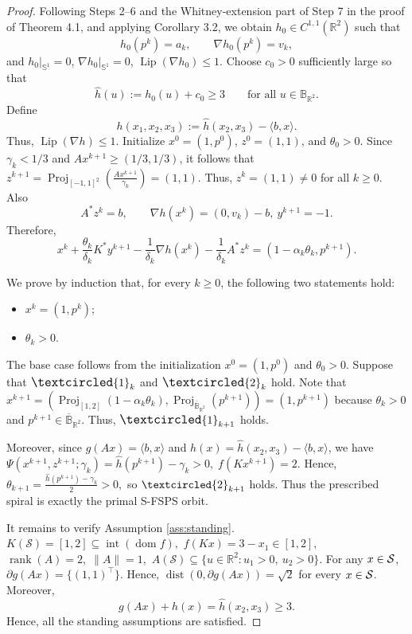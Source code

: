 \documentclass[11pt]{article}
\numberwithin{equation}{section}
\newcommand{\R}{\mathbb{R}}
\newcommand{\Sph}{\mathbb S}
\newcommand{\dist}{\operatorname{dist}}
\newcommand{\Proj}{\operatorname{Proj}}
\begin{document}
\begin{proof}
Following Steps 2--6 and the Whitney-extension part of Step 7 in the
proof of Theorem 4.1, and applying Corollary 3.2, we obtain
\(h_0\in C^{1,1}(\mathbb R^2)\) such that
\[
h_0(p^k)=a_k,
\qquad
\nabla h_0(p^k)=v_k,
\]
and
$h_0|_{\Sph^1}=0$,
$
\nabla h_0|_{\Sph^1}=0$,
$\operatorname{Lip}(\nabla h_0)\leq 1.
$
Choose $c_0>0$ sufficiently large so that
\[
    \widehat h(u):=h_0(u)+c_0\geq 3
    \qquad\text{for all }u\in\mathbb B_{\mathbb R^2}.
\]
Define
\[
    h(x_1,x_2,x_3)
    :=\widehat h(x_2,x_3)-\langle b,x\rangle.
\]
Thus, $\operatorname{Lip}(\nabla h)\leq 1$.
Initialize $x^0=(1,p^0)$, $z^0=(1,1)$, and $\theta_0>0$. Since $\gamma_k<1/3$ and $Ax^{k+1}\ge(1/3,1/3)$, it follows that
$z^{k+1}=\Proj_{[-1,1]^2}\left(\frac{A x^{k+1}}{\gamma_k}\right)=(1,1).$
Thus, $z^k=(1,1)\neq0$ for all $k\ge 0$. Also
\[
A^*z^k=b,\qquad \nabla h(x^k)=(0,v_k)-b,\ y^{k+1}=-1.
\]
Therefore,
\[
x^k+\frac{\theta_k}{\delta_k}K^* y^{k+1}-\frac1{\delta_k}\nabla h(x^k)-\frac1{\delta_k}A^*z^k=(1-\alpha_k\theta_k,p^{k+1}).
\]

We prove by induction that, for every $k\ge0$, the following two statements hold:
\begin{itemize}
\item[$\large{\textcircled{\small{1}}}_{k}$] $x^k=(1,p^k)$;
\item[$\large{\textcircled{\small{2}}}_{k}$] $\theta_k>0$.
\end{itemize}
The base case follows from the initialization $x^0=(1,p^0)$ and $\theta_0>0$.
Suppose that $\large{\textcircled{\small{1}}}_{k}$ and $\large{\textcircled{\small{2}}}_{k}$ hold.
Note that $x^{k+1}=(\Proj_{[1,2]}(1-\alpha_k\theta_k),\Proj_{\overline{\mathbb B}_{\R^2}}(p^{k+1}))=(1,p^{k+1})$
because $\theta_k>0$ and $p^{k+1}\in\overline{\mathbb B}_{\R^2}$.
Thus, $\large{\textcircled{\small{1}}}_{k+1}$ holds.

Moreover, since
\(g(Ax)=\langle b,x\rangle\) and
\(h(x)=\widehat h(x_2,x_3)-\langle b,x\rangle\), we have
$
\Psi(x^{k+1},z^{k+1};\gamma_k)
=\widehat h(p^{k+1})-\gamma_k>0,
\;
f(Kx^{k+1})=2.$ Hence,
$
\theta_{k+1}
=\frac{\widehat h(p^{k+1})-\gamma_k}{2}>0,
$
so \(\textcircled{\small 2}_{k+1}\) holds.
Thus the prescribed spiral is exactly the primal S-FSPS orbit.

It remains to  verify Assumption \ref{ass:standing}.
   $ K(\mathcal S)=[1,2]
    \subseteq \operatorname{int}(\operatorname{dom}f),$
    $f(Kx)=3-x_1\in[1,2],$
$
    \operatorname{rank}(A)=2,
    \;
    \|A\|=1,$
$A(\mathcal S)\subseteq
\{u\in\mathbb R^2:u_1>0,\ u_2>0\}.$
   For any $x\in{\cal S}$,
    $\partial g(Ax)=\{(1,1)^\top\}$.
Hence, $\dist(0,\partial g(Ax))=\sqrt{2}$ for every $x\in{\cal S}$. Moreover,
\[
g(Ax)+h(x)=\widehat h(x_2,x_3)\ge 3.
\]
Hence, all the standing assumptions are satisfied.


\end{proof}
\end{document}
